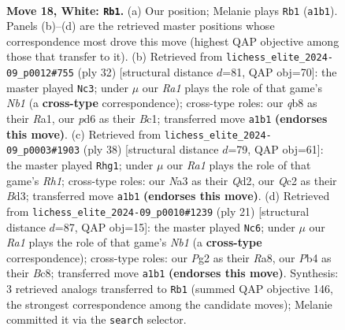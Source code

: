 \documentclass[11pt]{article}
\begin{document}
\clearpage

\begin{figure}[p]\centering
\begin{subfigure}{0.46\textwidth}\centering
\resizebox{\linewidth}{!}{%
\newchessgame
\chessboard[
  setfen={rq6/1bp1k1pp/1b1p1n2/1p2n3/pP2P3/N1P5/P1Q2PPP/R1B1RK2 w - - 2 18},
  showmover=false,
  pgfstyle=straightmove, color=movearrow, markmove={a1-b1}
]}
\caption{}
\end{subfigure}\hfill
\begin{subfigure}{0.46\textwidth}\centering
\resizebox{\linewidth}{!}{%
\newchessgame
\chessboard[
  setfen={r1b5/4bkpp/pqn2n2/1p1p4/2pP4/6P1/PP2QPBP/RNBR2K1 w - - 0 17},
  showmover=false,
  pgfstyle=straightmove, color=movearrow, markmove={b1-c3}
]}
\caption{}
\end{subfigure}
\\[4pt]
\begin{subfigure}{0.46\textwidth}\centering
\resizebox{\linewidth}{!}{%
\newchessgame
\chessboard[
  setfen={2r3k1/1bq1pp2/pn1p2p1/1p5n/3NP2P/2PB1P2/P1PQ4/K2R3R w - - 0 20},
  showmover=false,
  pgfstyle=straightmove, color=movearrow, markmove={h1-g1}
]}
\caption{}
\end{subfigure}\hfill
\begin{subfigure}{0.46\textwidth}\centering
\resizebox{\linewidth}{!}{%
\newchessgame
\chessboard[
  setfen={rnbq1rk1/pp2ppb1/6p1/3pN2p/3P1P1P/2P3P1/P3P1B1/R1BQK2R b KQ - 1 11},
  showmover=false,
  pgfstyle=straightmove, color=movearrow, markmove={b8-c6}
]}
\caption{}
\end{subfigure}
\caption{\textbf{Move 18, White: \texttt{Rb1}.} (a) Our position; Melanie plays \texttt{Rb1} (\texttt{a1b1}). Panels (b)--(d) are the retrieved master positions whose correspondence most drove this move (highest QAP objective among those that transfer to it). (b) Retrieved from \texttt{lichess\_elite\_2024-09\_p0012\#755} (ply 32) [structural distance $d$=81, QAP obj=70]: the master played \texttt{Nc3}; under $\mu$ our \emph{Ra1} plays the role of that game's \emph{Nb1} (a \textbf{cross-type} correspondence); cross-type roles: our \emph{q}b8 as their \emph{R}a1, our \emph{p}d6 as their \emph{B}c1; transferred move \texttt{a1b1} \textbf{(endorses this move)}. (c) Retrieved from \texttt{lichess\_elite\_2024-09\_p0003\#1903} (ply 38) [structural distance $d$=79, QAP obj=61]: the master played \texttt{Rhg1}; under $\mu$ our \emph{Ra1} plays the role of that game's \emph{Rh1}; cross-type roles: our \emph{N}a3 as their \emph{Q}d2, our \emph{Q}c2 as their \emph{B}d3; transferred move \texttt{a1b1} \textbf{(endorses this move)}. (d) Retrieved from \texttt{lichess\_elite\_2024-09\_p0010\#1239} (ply 21) [structural distance $d$=87, QAP obj=15]: the master played \texttt{Nc6}; under $\mu$ our \emph{Ra1} plays the role of that game's \emph{Nb1} (a \textbf{cross-type} correspondence); cross-type roles: our \emph{P}g2 as their \emph{R}a8, our \emph{P}b4 as their \emph{B}c8; transferred move \texttt{a1b1} \textbf{(endorses this move)}. Synthesis: 3 retrieved analogs transferred to \texttt{Rb1} (summed QAP objective 146, the strongest correspondence among the candidate moves); Melanie committed it via the \texttt{search} selector.}
\label{fig:thought-m34}
\end{figure}
\end{document}
